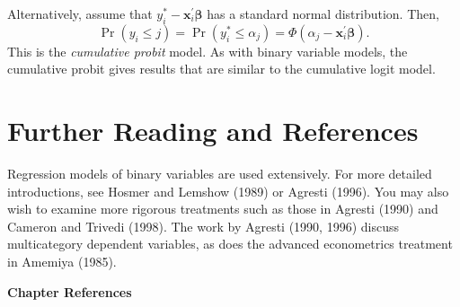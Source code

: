 Alternatively, assume that $y_i^{\ast} -
\mathbf{x}_i^{\prime}\boldsymbol \beta$ has a standard normal
distribution. Then,
\begin{equation*}
\Pr(y_i \leq j ) = \Pr(y_i^{\ast} \leq \alpha_j) =\Phi \left(
\alpha_j - \mathbf{x}_i^{\prime}\boldsymbol \beta \right).
\end{equation*}
This is the \emph{cumulative probit} model. As with binary variable
models, the cumulative probit gives results that are similar to the
cumulative logit model.

\section{Further Reading and References}

Regression models of binary variables are used extensively. For more
detailed introductions, see Hosmer and Lemshow (1989) or Agresti
(1996). You may also wish to examine more rigorous treatments such
as those in Agresti (1990) and Cameron and Trivedi (1998). The work
by Agresti (1990, 1996) discuss multicategory dependent variables,
as does the advanced econometrics treatment in Amemiya (1985).

\bigskip

\textbf{Chapter References}

